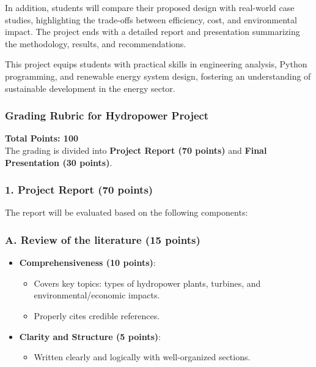 \documentclass[11pt]{article}
\begin{document}
In addition, students will compare their proposed design with real-world case studies, highlighting the trade-offs between efficiency, cost, and environmental impact. The project ends with a detailed report and presentation summarizing the methodology, results, and recommendations.

This project equips students with practical skills in engineering analysis, Python programming, and renewable energy system design, fostering an understanding of sustainable development in the energy sector.


\subsubsection*{Grading Rubric for Hydropower Project}

\textbf{Total Points: 100}\\
The grading is divided into \textbf{Project Report (70 points)} and \textbf{Final Presentation (30 points)}.

\subsubsection*{1. Project Report (70 points)}
The report will be evaluated based on the following components:

\subsubsection*{A. Review of the literature (15 points)}
\begin{itemize}
    \item \textbf{Comprehensiveness (10 points)}:
    \begin{itemize}
        \item Covers key topics: types of hydropower plants, turbines, and environmental/economic impacts.
        \item Properly cites credible references.
    \end{itemize}
    \item \textbf{Clarity and Structure (5 points)}:
    \begin{itemize}
        \item Written clearly and logically with well-organized sections.
    \end{itemize}
\end{itemize}
\end{document}
